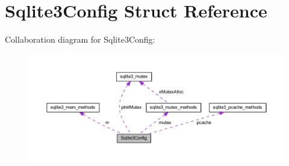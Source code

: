 \hypertarget{struct_sqlite3_config}{\section{Sqlite3\-Config Struct Reference}
\label{struct_sqlite3_config}
}


Collaboration diagram for Sqlite3\-Config\-:\nopagebreak
\begin{figure}[H]
\begin{center}
\leavevmode
\includegraphics[width=350pt]{struct_sqlite3_config__coll__graph}
\end{center}
\end{figure}
